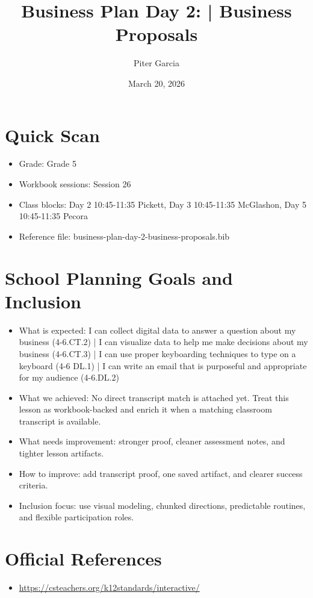 \documentclass[11pt]{article}
\title{Business Plan Day 2: | Business Proposals}
\author{Piter Garcia}
\date{March 20, 2026}
\begin{document}
\maketitle
\section*{Quick Scan}
\begin{itemize}[leftmargin=*]
\item Grade: Grade 5
\item Workbook sessions: Session 26
\item Class blocks: Day 2 10:45-11:35 Pickett, Day 3 10:45-11:35 McGlashon, Day 5 10:45-11:35 Pecora
\item Reference file: business-plan-day-2-business-proposals.bib
\end{itemize}
\section*{School Planning Goals and Inclusion}
\begin{itemize}[leftmargin=*]
\item What is expected: I can collect digital data to answer a question about my business (4-6.CT.2) | I can visualize data to help me make decisions about my business (4-6.CT.3) | I can use proper keyboarding techniques to type on a keyboard (4-6 DL.1) | I can write an email that is purposeful and appropriate for my audience (4-6.DL.2)
\item What we achieved: No direct transcript match is attached yet. Treat this lesson as workbook-backed and enrich it when a matching classroom transcript is available.
\item What needs improvement: stronger proof, cleaner assessment notes, and tighter lesson artifacts.
\item How to improve: add transcript proof, one saved artifact, and clearer success criteria.
\item Inclusion focus: use visual modeling, chunked directions, predictable routines, and flexible participation roles.
\end{itemize}
\section*{Official References}
\begin{itemize}[leftmargin=*]
\item \url{https://csteachers.org/k12standards/interactive/}

\end{itemize}
\end{document}
